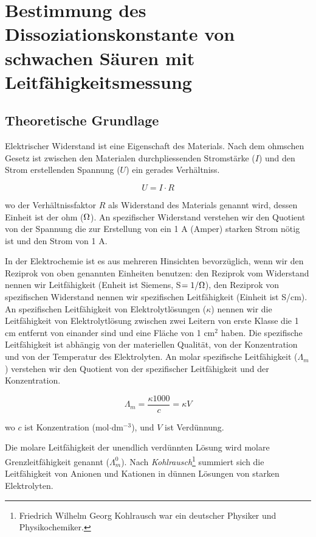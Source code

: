 \section{Bestimmung des Dissoziationskonstante von schwachen Säuren mit Leitfähigkeitsmessung}
\subsection{Theoretische Grundlage}

Elektrischer Widerstand ist eine Eigenschaft des Materials. Nach dem ohmschen Gesetz ist zwischen den Materialen durchpliessenden Stromstärke ($I$) und den Strom erstellenden Spannung ($U$) ein gerades Verhältniss.


\begin{equation}
\label{eq:ohm}
	U
	=
	I
	\cdot
	R
\end{equation}

wo der Verhältnissfaktor $R$ als Widerstand des Materials genannt wird, dessen Einheit ist der ohm ($\ohm$).
An spezifischer Widerstand verstehen wir den Quotient von der Spannung die zur Erstellung von ein 1 A (Amper) starken Strom nötig ist und den Strom von 1 A. %

In der Elektrochemie ist es aus mehreren Hinsichten bevorzüglich, wenn wir den Reziprok von oben genannten Einheiten benutzen: den Reziprok vom Widerstand nennen wir Leitfähigkeit (Enheit ist Siemens, S$ = 1 / \ohm$), den Reziprok von spezifischen Widerstand nennen wir spezifischen Leitfähigkeit (Einheit ist S/cm).
An spezifischen Leitfähigkeit von Elektrolytlösungen ($\kappa$) nennen wir die Leitfähigkeit von Elektrolytlösung zwischen zwei Leitern von erste Klasse die 1 cm entfernt von einander sind und eine Fläche von 1 cm$^2$ haben.
Die spezifische Leitfähigkeit ist abhängig von der materiellen Qualität, von der Konzentration und von der Temperatur des Elektrolyten.
An molar spezifische Leitfähigkeit ($\Lambda _m$) verstehen wir den Quotient von der spezifischer Leitfähigkeit und der Konzentration.

\begin{equation}
\label{eq:lambdam}
        \Lambda_m
        =
        \frac
		{\kappa 1000 }
		{c}
	=
	\kappa V
\end{equation}

wo $c$ ist Konzentration (mol$\cdot$dm$^{-3}$), und $V$ ist Verdünnung.

Die molare Leitfähigkeit der unendlich verdünnten Lösung wird molare Grenzleitfähigkeit genannt ($\Lambda _m^0$).
Nach \emph{Kohlrausch}\footnote{Friedrich Wilhelm Georg Kohlrausch war ein deutscher Physiker und Physikochemiker.} summiert sich die Leitfähigkeit von Anionen und Kationen in dünnen Lösungen von starken Elektrolyten. 

